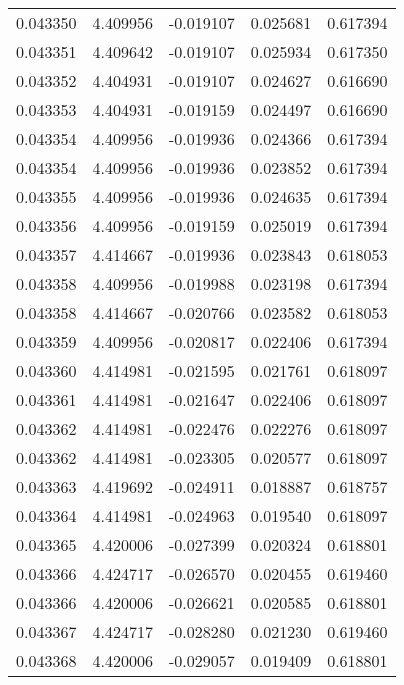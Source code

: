 \begin{tabular}{lrrrr}
0.043350    &  4.409956 & -0.019107 &  0.025681 &             0.617394 \\
0.043351    &  4.409642 & -0.019107 &  0.025934 &             0.617350 \\
0.043352    &  4.404931 & -0.019107 &  0.024627 &             0.616690 \\
0.043353    &  4.404931 & -0.019159 &  0.024497 &             0.616690 \\
0.043354    &  4.409956 & -0.019936 &  0.024366 &             0.617394 \\
0.043354    &  4.409956 & -0.019936 &  0.023852 &             0.617394 \\
0.043355    &  4.409956 & -0.019936 &  0.024635 &             0.617394 \\
0.043356    &  4.409956 & -0.019159 &  0.025019 &             0.617394 \\
0.043357    &  4.414667 & -0.019936 &  0.023843 &             0.618053 \\
0.043358    &  4.409956 & -0.019988 &  0.023198 &             0.617394 \\
0.043358    &  4.414667 & -0.020766 &  0.023582 &             0.618053 \\
0.043359    &  4.409956 & -0.020817 &  0.022406 &             0.617394 \\
0.043360    &  4.414981 & -0.021595 &  0.021761 &             0.618097 \\
0.043361    &  4.414981 & -0.021647 &  0.022406 &             0.618097 \\
0.043362    &  4.414981 & -0.022476 &  0.022276 &             0.618097 \\
0.043362    &  4.414981 & -0.023305 &  0.020577 &             0.618097 \\
0.043363    &  4.419692 & -0.024911 &  0.018887 &             0.618757 \\
0.043364    &  4.414981 & -0.024963 &  0.019540 &             0.618097 \\
0.043365    &  4.420006 & -0.027399 &  0.020324 &             0.618801 \\
0.043366    &  4.424717 & -0.026570 &  0.020455 &             0.619460 \\
0.043366    &  4.420006 & -0.026621 &  0.020585 &             0.618801 \\
0.043367    &  4.424717 & -0.028280 &  0.021230 &             0.619460 \\
0.043368    &  4.420006 & -0.029057 &  0.019409 &             0.618801 \\

\end{tabular}
